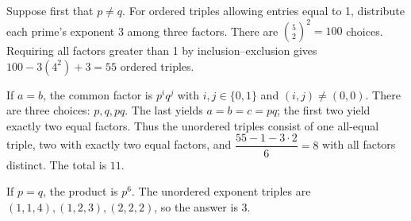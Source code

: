Suppose first that $p\ne q$. For ordered triples allowing entries equal to 1, distribute each prime's exponent 3 among three factors. There are $\binom52^2=100$ choices. Requiring all factors greater than 1 by inclusion--exclusion gives $100-3(4^2)+3=55$ ordered triples.

If $a=b$, the common factor is $p^i q^j$ with $i,j\in\{0,1\}$ and $(i,j)\ne(0,0)$. There are three choices: $p,q,pq$. The last yields $a=b=c=pq$; the first two yield exactly two equal factors. Thus the unordered triples consist of one all-equal triple, two with exactly two equal factors, and $\dfrac{55-1-3\cdot2}{6}=8$ with all factors distinct. The total is $\boxed{11}$.

If $p=q$, the product is $p^6$. The unordered exponent triples are $(1,1,4),(1,2,3),(2,2,2)$, so the answer is $\boxed3$.

